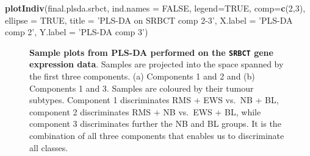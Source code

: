 \documentclass[]{book}
\newenvironment{Shaded}{\begin{snugshade}}{\end{snugshade}}
\newcommand{\KeywordTok}[1]{\textcolor[rgb]{0.13,0.29,0.53}{\textbf{#1}}}
\newcommand{\DataTypeTok}[1]{\textcolor[rgb]{0.13,0.29,0.53}{#1}}
\newcommand{\DecValTok}[1]{\textcolor[rgb]{0.00,0.00,0.81}{#1}}
\newcommand{\StringTok}[1]{\textcolor[rgb]{0.31,0.60,0.02}{#1}}
\newcommand{\OtherTok}[1]{\textcolor[rgb]{0.56,0.35,0.01}{#1}}
\newcommand{\NormalTok}[1]{#1}
\begin{document}
\begin{Shaded}
\begin{Highlighting}[]
\KeywordTok{plotIndiv}\NormalTok{(final.plsda.srbct, }\DataTypeTok{ind.names =} \OtherTok{FALSE}\NormalTok{, }\DataTypeTok{legend=}\OtherTok{TRUE}\NormalTok{,}
          \DataTypeTok{comp=}\KeywordTok{c}\NormalTok{(}\DecValTok{2}\NormalTok{,}\DecValTok{3}\NormalTok{), }\DataTypeTok{ellipse =} \OtherTok{TRUE}\NormalTok{, }
          \DataTypeTok{title =} \StringTok{'PLS-DA on SRBCT comp 2-3'}\NormalTok{,}
          \DataTypeTok{X.label =} \StringTok{'PLS-DA comp 2'}\NormalTok{, }\DataTypeTok{Y.label =} \StringTok{'PLS-DA comp 3'}\NormalTok{)}
\end{Highlighting}
\end{Shaded}

\begin{figure}

{\centering {}

}

\caption{\textbf{Sample plots from PLS-DA performed on the
\texttt{SRBCT} gene expression data}. Samples are projected into the
space spanned by the first three components. (a) Components 1 and 2 and
(b) Components 1 and 3. Samples are coloured by their tumour subtypes.
Component 1 discriminates RMS + EWS vs.~NB + BL, component 2
discriminates RMS + NB vs.~EWS + BL, while component 3 discriminates
further the NB and BL groups. It is the combination of all three
components that enables us to discriminate all classes.}\label{fig:plsda-plotindiv}
\end{figure}
\end{document}
